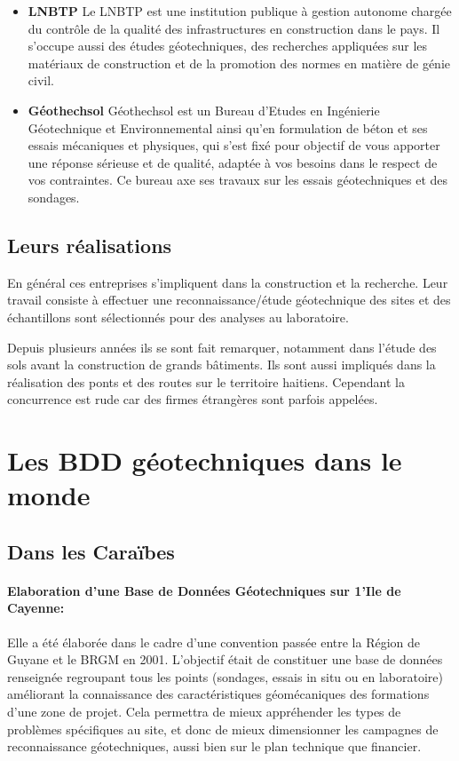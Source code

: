 \begin{itemize}
            \item \textbf{LNBTP}
        Le LNBTP est une institution publique à gestion autonome chargée du contrôle de la qualité des infrastructures en construction dans le pays. Il s'occupe 
        aussi des études géotechniques, des recherches appliquées sur les matériaux de construction et de la promotion des normes en matière de génie civil.
            \item \textbf{Géothechsol}
        Géothechsol est un Bureau d’Etudes en Ingénierie Géotechnique et Environnemental ainsi qu’en formulation de béton et ses essais mécaniques et physiques,
         qui s’est fixé pour objectif de vous apporter une réponse sérieuse et de qualité, adaptée à vos besoins dans le respect de vos contraintes.
         Ce bureau axe ses travaux sur les essais géotechniques et des sondages.
        \end{itemize}
        
        
        \subsection{Leurs réalisations}
        En général ces entreprises s'impliquent dans la construction et la recherche. 
        Leur travail consiste à effectuer une reconnaissance/étude géotechnique des sites et des échantillons  sont sélectionnés pour des analyses au
        laboratoire.
        \par
        Depuis plusieurs années ils se sont fait remarquer, notamment dans
         l'étude des sols avant la construction de grands bâtiments. Ils sont aussi impliqués dans la réalisation des ponts et des routes sur le territoire
          haitiens. Cependant la concurrence est rude car des firmes étrangères sont parfois appelées. 
        \section{Les BDD géotechniques dans le monde}
        \subsection{Dans les Caraïbes}
        \paragraph{Elaboration d'une Base de Données Géotechniques
        sur 1'Ile de Cayenne: }
        Elle a été élaborée dans le cadre d'une convention passée entre la
        Région de Guyane et le BRGM en 2001.
        \cite{Cayenne}
         L'objectif était de constituer une base de données renseignée regroupant tous les points (sondages, essais
        in situ ou en laboratoire) améliorant la connaissance des caractéristiques géomécaniques des
        formations d'une zone de projet. Cela permettra de mieux appréhender les types de problèmes
        spécifiques au site, et donc de mieux dimensionner les campagnes de reconnaissance
        géotechniques, aussi bien sur le plan technique que financier.
